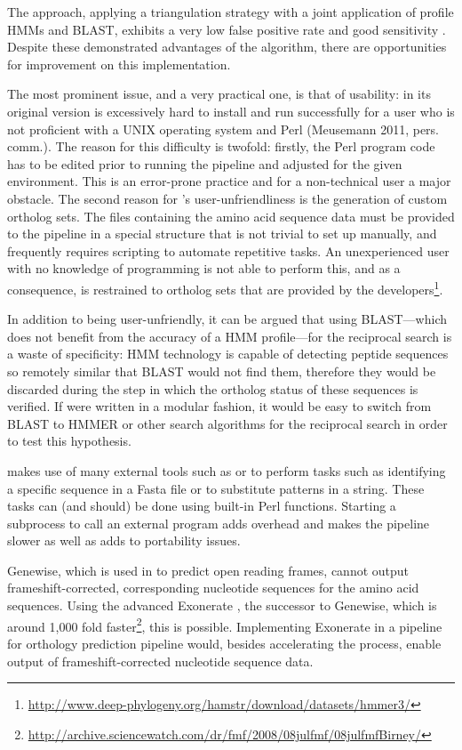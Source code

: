 The \hamstr approach, applying a triangulation strategy with a joint application
of profile HMMs and BLAST, exhibits a very low false positive rate and good
sensitivity \citep{ebersberger2009}. Despite these demonstrated advantages of
the \hamstr algorithm, there are opportunities for improvement on this
implementation.

The most prominent issue, and a very practical one, is that of usability:
\hamstr in its original version is excessively hard to install and run
successfully for a user who is not proficient with a UNIX operating system and
Perl (Meusemann 2011, pers. comm.). The reason for this difficulty is twofold:
firstly, the Perl program code has to be edited prior to running the pipeline
and adjusted for the given environment. This is an error-prone practice and for
a non-technical user a major obstacle. The second reason for \hamstr's
user-unfriendliness is the generation of custom ortholog sets. The files
containing the amino acid sequence data must be provided to the pipeline in a
special structure that is not trivial to set up manually, and frequently
requires scripting to automate repetitive tasks. An unexperienced user with no
knowledge of programming is not able to perform this, and as a consequence, is
restrained to ortholog sets that are provided by the
developers\footnote{\url{http://www.deep-phylogeny.org/hamstr/download/datasets/hmmer3/}}.

In addition to \hamstr being user-unfriendly, it can be argued that using
BLAST---which does not benefit from the accuracy of a HMM profile---for the
reciprocal search is a waste of specificity: HMM technology is capable of
detecting peptide sequences so remotely similar that BLAST would not find them,
therefore they would be discarded during the step in which the ortholog status
of these sequences is verified. If \hamstr were written in a modular fashion, it
would be easy to switch from BLAST to HMMER or other search algorithms for the
reciprocal search in order to test this hypothesis. 

\hamstr makes use of many external tools such as  or  to
perform tasks such as identifying a specific sequence in a Fasta file or to
substitute patterns in a string. These tasks can (and should) be done using
built-in Perl functions. Starting a subprocess to call an external program adds
overhead and makes the pipeline slower as well as adds to portability issues.

Genewise, which is used in \hamstr to predict open reading frames, cannot output
frameshift-corrected, corresponding nucleotide sequences for the amino acid
sequences. Using the advanced Exonerate \citep{slater2005}, the successor to
Genewise, which is around 1,000 fold
faster\footnote{\url{http://archive.sciencewatch.com/dr/fmf/2008/08julfmf/08julfmfBirney/}},
this is possible. Implementing Exonerate in a pipeline for orthology prediction
pipeline would, besides accelerating the process, enable output of
frameshift-corrected nucleotide sequence data.

